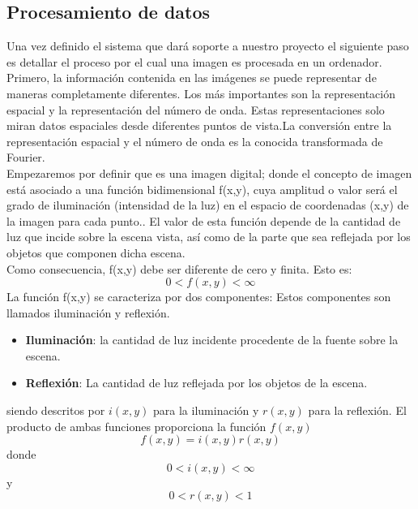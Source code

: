 \subsection{Procesamiento de datos}
Una vez definido el sistema que dará soporte a nuestro proyecto el siguiente paso es detallar el
proceso por el cual una imagen es procesada en un ordenador.\\
Primero, la información contenida en las imágenes se puede representar de maneras completamente diferentes. 
Los más importantes son la representación espacial y la representación del número de onda. Estas representaciones solo 
miran datos espaciales desde diferentes puntos de vista.La conversión entre la representación espacial y el número de 
onda es la conocida transformada de Fourier.\cite{Bernd1997}\\
Empezaremos por definir que es una imagen digital; donde el concepto de imagen está asociado a una función 
bidimensional f(x,y), cuya amplitud o valor será el grado de iluminación (intensidad de la luz) en el espacio de
coordenadas (x,y) de la imagen para cada punto.\cite{arturodelaescalera2011}.
El valor de esta función depende de la
cantidad de luz que incide sobre la escena vista, así como de la parte que sea reflejada
por los objetos que componen dicha escena.\\
Como consecuencia, f(x,y) debe ser diferente de cero y finita. Esto es:
\begin{equation}
    0 < f(x,y) < \infty
\end{equation}
La función f(x,y) se caracteriza por dos componentes: \cite{joseramon2005} Estos componentes son llamados
iluminación y reflexión.
\begin{itemize}
    \item \textbf{Iluminación}: la cantidad de luz incidente procedente de la fuente sobre la
    escena.
    \item \textbf{Reflexión}: La cantidad de luz reflejada por los objetos de la escena.
\end{itemize}
siendo descritos por $i(x,y)$ para la iluminación y $r(x,y)$ para la reflexión. El producto de ambas funciones
proporciona la función $f(x,y)$
\begin{equation}
    f(x,y) = i(x,y)r(x,y)
\end{equation}
donde 
\begin{equation}
    0 < i(x,y) < \infty
\end{equation}
y 
\begin{equation}
    0 < r(x,y) < 1
\end{equation}
